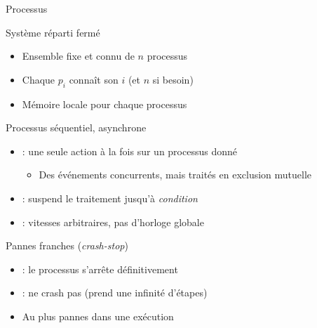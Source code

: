
\begingroup

\begin{frame}{Processus}

  \begin{block}{Système réparti fermé}
    \begin{itemize}
    \item Ensemble fixe et connu de $n$ processus 
    \item Chaque $p_i$ connaît son  $i$ (et $n$ si besoin)
    \item Mémoire locale  pour chaque processus
    \end{itemize}
  \end{block}

  \begin{block}{Processus séquentiel, asynchrone}
    \begin{itemize}
      \item {} : une seule action à la fois sur un processus donné
        \begin{itemize}
        \item Des événements concurrents, mais traités en exclusion mutuelle 
        \end{itemize}
      \item {} :  suspend le traitement jusqu'à \textit{condition}
      \item {} : vitesses arbitraires, pas d’horloge globale
    \end{itemize}
  \end{block}

  \begin{block}{Pannes franches (\textit{crash-stop})}
    \begin{itemize}
      \item {} : le processus s’arrête définitivement
      \item {} : ne crash pas (prend une infinité d’étapes)
      \item Au plus  pannes dans une exécution
    \end{itemize}
  \end{block}

\end{frame}

\endgroup
\endinput


